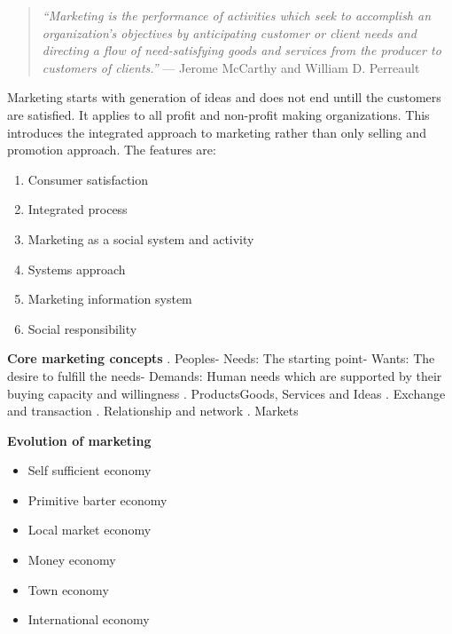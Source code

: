 \documentclass[11pt,]{book}
\providecommand{\tightlist}{%
  \setlength{\itemsep}{0pt}\setlength{\parskip}{0pt}}
\theoremstyle{definition}
\theoremstyle{definition}
\theoremstyle{definition}
\theoremstyle{remark}
\begin{document}
\begin{quote}
\emph{``Marketing is the performance of activities which seek to
accomplish an organization's objectives by anticipating customer or
client needs and directing a flow of need-satisfying goods and services
from the producer to customers of clients.''} --- Jerome McCarthy and
William D. Perreault
\end{quote}

Marketing starts with generation of ideas and does not end untill the
customers are satisfied. It applies to all profit and non-profit making
organizations. This introduces the integrated approach to marketing
rather than only selling and promotion approach. The features are:

\begin{enumerate}
\def\labelenumi{\arabic{enumi}.}
\tightlist
\item
  Consumer satisfaction
\item
  Integrated process
\item
  Marketing as a social system and activity
\item
  Systems approach
\item
  Marketing information system
\item
  Social responsibility
\end{enumerate}

\textbf{Core marketing concepts} . Peoples\newline - Needs:
The starting point\newline - Wants: The desire to fulfill the
needs\newline - Demands: Human needs which are supported by their buying
capacity and willingness . Products\newline Goods, Services
and Ideas . Exchange and transaction . Relationship
and network . Markets

\textbf{Evolution of marketing}

\begin{itemize}
\tightlist
\item
  Self sufficient economy
\item
  Primitive barter economy
\item
  Local market economy
\item
  Money economy
\item
  Town economy
\item
  International economy
\end{itemize}
\end{document}
